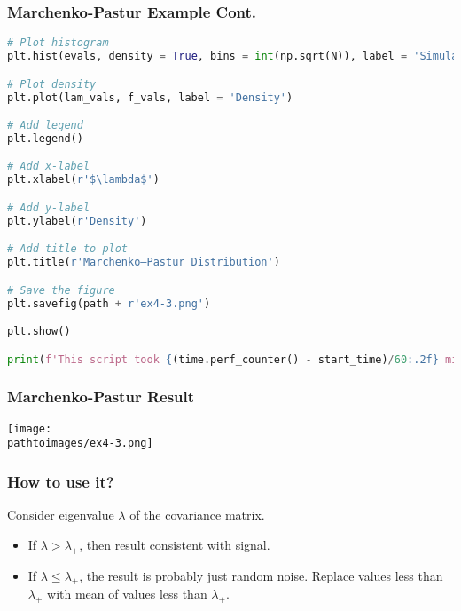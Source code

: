 \documentclass{beamer}
\newcommand{\pathtoimages}{/Users/charlesrambo/Desktop/Bootcamp24/Images}
\begin{document}
\begin{frame}[fragile]
\frametitle{Marchenko-Pastur Example Cont.}

\begin{lstlisting}[language=Python]
# Plot histogram
plt.hist(evals, density = True, bins = int(np.sqrt(N)), label = 'Simulated Distribution')

# Plot density
plt.plot(lam_vals, f_vals, label = 'Density')

# Add legend
plt.legend()

# Add x-label
plt.xlabel(r'$\lambda$')

# Add y-label
plt.ylabel(r'Density')

# Add title to plot
plt.title(r'Marchenko–Pastur Distribution')

# Save the figure
plt.savefig(path + r'ex4-3.png')

plt.show()

print(f'This script took {(time.perf_counter() - start_time)/60:.2f} minutes to run.')
\end{lstlisting}

\end{frame}

\begin{frame}[fragile]
\frametitle{Marchenko-Pastur Result}

\begin{center}
\texttt{[image: \\pathtoimages/ex4-3.png]}
\end{center}

\end{frame}

\begin{frame}
\frametitle{How to use it?}
Consider eigenvalue $\lambda$ of the covariance matrix.
\begin{itemize}
\item If $\lambda > \lambda_+$, then result consistent with signal. 
\item If $\lambda \leq \lambda_+$, the result is probably just random noise. Replace values less than $\lambda_+$ with mean of values less than $\lambda_+$.
\end{itemize}

\end{frame}
\end{document}
